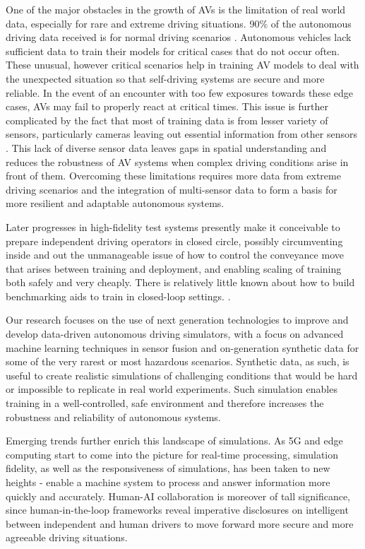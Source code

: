 \documentclass[lettersize,journal]{IEEEtran}
\begin{document}
One of the major obstacles in the growth of AVs is the limitation of real world data, especially for rare and extreme driving situations.  90\% of the autonomous driving data received is for normal driving scenarios \cite{ref1}. Autonomous vehicles lack sufficient data to train their models for critical cases that do not occur often. These unusual, however critical scenarios help in training AV models to deal with the unexpected situation so that self-driving systems are secure and more reliable. In the event of an encounter with too few exposures towards these edge cases, AVs may fail to properly react at critical times.
This issue is further complicated by the fact that most of training data is from lesser variety of sensors, particularly cameras leaving out essential information from other sensors \cite{ref1}. This lack of diverse sensor data leaves gaps in spatial understanding and reduces the robustness of AV systems when complex driving conditions arise in front of them. Overcoming these limitations requires more data from extreme driving scenarios and the integration of multi-sensor data to form a basis for more resilient and adaptable autonomous systems.

Later progresses in high-fidelity test systems presently make it conceivable to prepare independent driving operators in closed circle, possibly circumventing inside and out the unmanageable issue of how to control the conveyance move that arises between training and deployment, and enabling scaling of training both safely and very cheaply. There is relatively little known about how to build benchmarking aids to train in closed-loop settings. \cite{zhang2022rethinking}.

Our research focuses on the use of next generation technologies to improve and develop data-driven autonomous driving simulators, with a focus on advanced machine learning techniques in sensor fusion and on-generation synthetic data for some of the very rarest or most hazardous scenarios. Synthetic data, as such, is useful to create realistic simulations of challenging conditions that would be hard or impossible to replicate in real world experiments. Such simulation enables training in a well-controlled, safe environment and therefore increases the robustness and reliability of autonomous systems.

Emerging trends further enrich this landscape of simulations. As 5G and edge computing start to come into the picture for real-time processing, simulation fidelity, as well as the responsiveness of simulations, has been taken to new heights - enable a machine system to process and answer information more quickly and accurately. Human-AI collaboration is moreover of tall significance, since human-in-the-loop frameworks reveal imperative disclosures on intelligent between independent and human drivers to move forward more secure and more agreeable driving situations.
\end{document}
